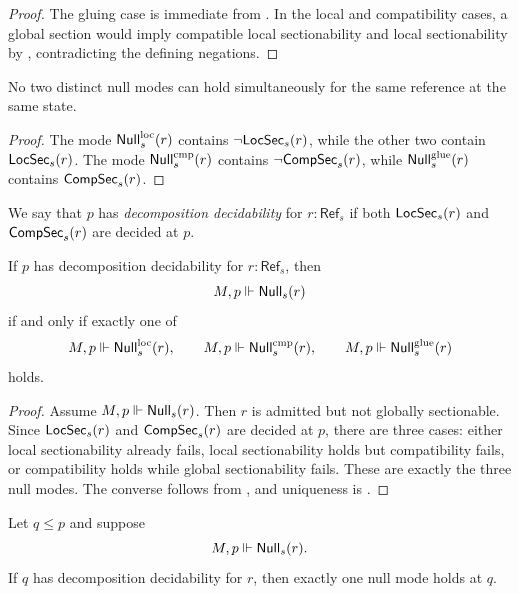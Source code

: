 \begin{proof}
The gluing case is immediate from . In the local and compatibility cases, a global section would imply compatible local sectionability and local sectionability by , contradicting the defining negations.
\end{proof}

\begin{proposition}\label{prop:null-modes-exclusive}
No two distinct null modes can hold simultaneously for the same reference at the same state.
\end{proposition}

\begin{proof}
The mode $\mathsf{Null}^{\mathrm{loc}}_s(r)$ contains $\neg\mathsf{LocSec}_s(r)$, while the other two contain $\mathsf{LocSec}_s(r)$. The mode $\mathsf{Null}^{\mathrm{cmp}}_s(r)$ contains $\neg\mathsf{CompSec}_s(r)$, while $\mathsf{Null}^{\mathrm{glue}}_s(r)$ contains $\mathsf{CompSec}_s(r)$.
\end{proof}

\begin{definition}\label{def:decomposition-decidability}
We say that $p$ has \emph{decomposition decidability} for $r:\mathsf{Ref}_s$ if both $\mathsf{LocSec}_s(r)$ and $\mathsf{CompSec}_s(r)$ are decided at $p$.
\end{definition}

\begin{proposition}\label{prop:null-trichotomy}
If $p$ has decomposition decidability for $r:\mathsf{Ref}_s$, then
\[
M,p\Vdash \mathsf{Null}_s(r)
\]
if and only if exactly one of
\[
M,p\Vdash \mathsf{Null}^{\mathrm{loc}}_s(r),\qquad
M,p\Vdash \mathsf{Null}^{\mathrm{cmp}}_s(r),\qquad
M,p\Vdash \mathsf{Null}^{\mathrm{glue}}_s(r)
\]
holds.
\end{proposition}

\begin{proof}
Assume $M,p\Vdash \mathsf{Null}_s(r)$. Then $r$ is admitted but not globally sectionable. Since $\mathsf{LocSec}_s(r)$ and $\mathsf{CompSec}_s(r)$ are decided at $p$, there are three cases: either local sectionability already fails, local sectionability holds but compatibility fails, or compatibility holds while global sectionability fails. These are exactly the three null modes. The converse follows from , and uniqueness is .
\end{proof}

\begin{theorem}\label{thm:null-classification-under-refinement}
Let $q\le p$ and suppose
\[
M,p\Vdash \mathsf{Null}_s(r).
\]
If $q$ has decomposition decidability for $r$, then exactly one null mode holds at $q$.
\end{theorem}

